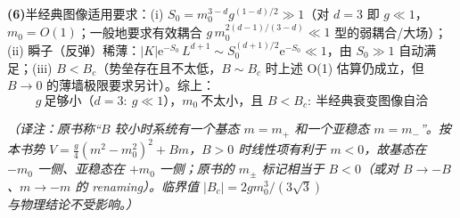 \textbf{(6)}半经典图像适用要求：(i) $S_0=m_0^{3-d}g^{(1-d)/2}\gg1$（对 $d=3$ 即 $g\ll1$，$m_0=O(1)$；一般地要求有效耦合 $g\,m_0^{2(d-1)/(3-d)}\ll1$ 型的弱耦合/大场）；(ii) 瞬子（反弹）稀薄：$|K|\mathrm{e}^{-S_0}\,L^{d+1}\sim S_0^{(d+1)/2}\mathrm{e}^{-S_0}\ll1$，由 $S_0\gg1$ 自动满足；(iii) $B<B_c$（势垒存在且不太低，$B\sim B_c$ 时上述 O(1) 估算仍成立，但 $B\to0$ 的薄墙极限要求另计）。综上：
\begin{equation*}
\boxed{\;g\ \text{足够小（}d=3:\ g\ll1\text{），}m_0\ \text{不太小，且 }B<B_c:\ \text{半经典衰变图像自洽}\;}
\end{equation*}

\emph{（译注：原书称“$B$ 较小时系统有一个基态 $m=m_+$ 和一个亚稳态 $m=m_-$”。按本书势 $V=\frac g4(m^2-m_0^2)^2+Bm$，$B>0$ 时线性项有利于 $m<0$，故基态在 $-m_0$ 一侧、亚稳态在 $+m_0$ 一侧；原书的 $m_\pm$ 标记相当于 $B<0$（或对 $B\to-B$、$m\to-m$ 的 renaming）。临界值 $|B_c|=2gm_0^3/(3\sqrt3)$ 与物理结论不受影响。）}

